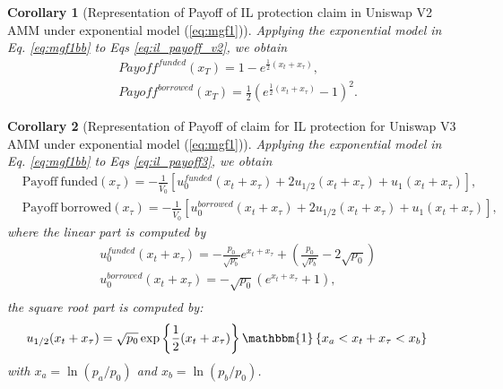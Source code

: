 \documentclass[pdftex,11pt,a4paper] {article}
\newtheorem{corollary}{Corollary}[section]
\begin{document}
\begin{corollary}[Representation of Payoff of IL protection claim in Uniswap V2 AMM under exponential model (\protect\ref{eq:mgf1})]
Applying the exponential model in Eq. \eqref{eq:mgf1bb} to Eqs %
\eqref{eq:il_payoff_v2}, we obtain
\begin{equation}  \label{eq:il_payoff_v2b}
\begin{split}
& Payoff^{funded}(x_{T}) = 1 - e^{ \frac{1}{2} (x_{t} + x_{\tau})} , \\
& Payoff^{borrowed}(x_{T}) = \frac{1}{2} \left( e^{ \frac{1}{2} (x_{t} +
x_{\tau})} - 1\right)^{2}.
\end{split}%
\end{equation}
\end{corollary}

\begin{corollary}[Representation of Payoff of claim for IL protection for Uniswap V3 AMM under exponential model (\protect\ref{eq:mgf1})]
Applying the exponential model in Eq. \eqref{eq:mgf1bb} to Eqs %
\eqref{eq:il_payoff3}, we obtain
\begin{equation}  \label{eq:il_payoff_e1}
\begin{split}
& \mathrm{Payoff \ funded}(x_{\tau}) = - \frac{1}{\bar{V}_{0}}\left[u^{funded}_{0}(x_{t}+x_{\tau}) +
2u_{1/2}(x_{t}+x_{\tau}) + u_{1}(x_{t}+x_{\tau})\right], \\
& \mathrm{Payoff \ borrowed} (x_{\tau}) = - \frac{1}{\bar{V}_{0}}\left[u^{borrowed}_{0}(x_{t}+x_{\tau}) +
2u_{1/2}(x_{t}+x_{\tau}) + u_{1}(x_{t}+x_{\tau})\right],
\end{split}%
\end{equation}
where the linear part is computed by
\begin{equation}  \label{eq:lp1}
\begin{split}
& u^{funded}_{0}(x_{t}+x_{\tau}) = -\frac{p_{0}}{\sqrt{p_{b}}}
e^{x_{t}+x_{\tau}} + \left(\frac{p_{0}}{\sqrt{p_{b}}}-2\sqrt{p_{0}}\right) \\
& u^{borrowed}_{0}(x_{t}+x_{\tau}) =- \sqrt{p_{0}} \left(e^{x_{t}+x_{\tau}}
+1\right), \\
\end{split}%
\end{equation}
the square root part is computed by:
\begin{equation}  \label{eq:mgf3}
\begin{split}
u_{1/2}(x_{t}+x_{\tau}) & = \sqrt{p_{0}}\exp\left\{\frac{1}{2}
(x_{t}+x_{\tau}) \right\} \mathbbm{1}\left\{ x_{a} < x_{t}+x_{\tau} <
x_{b}\right\}
\end{split}%
\end{equation}
with $x_{a}=\ln(p_{a}/p_{0})$ and $x_{b}=\ln(p_{b}/p_{0})$.


\end{corollary}
\end{document}
